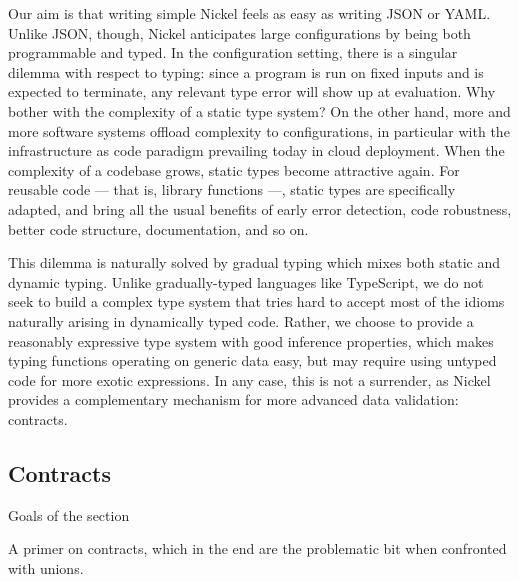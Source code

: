 \documentclass[sigplan,10pt,review,anonymous]{acmart}
\newcommand{\unsure}[2][1=]{}
\begin{document}
Our aim is that writing simple Nickel feels as easy as writing JSON or YAML.
Unlike JSON, though, Nickel anticipates large configurations by being both
programmable and typed. In the configuration setting, there is a singular
dilemma with respect to typing: since a program is run on fixed inputs and is
expected to terminate, any relevant type error will show up at evaluation.  Why
bother with the complexity of a static type system? On the other hand, more and
more software systems offload complexity to configurations, in particular with
the infrastructure as code paradigm prevailing today in cloud deployment. When
the complexity of a codebase grows, static types become attractive again.  For
reusable code — that is, library functions —, static types are specifically
adapted, and bring all the usual benefits of early error detection, code
robustness, better code structure, documentation, and so on.

This dilemma is naturally solved by gradual typing\cite{Siek06gradualtyping}
which mixes both static and dynamic typing. Unlike gradually-typed languages
like TypeScript\unsure{Todo: explain that typescript uses unions as
  static typing whereas we are speaking of dynamic contracts}, we do not seek to build a complex type system that tries hard
to accept most of the idioms naturally arising in dynamically typed code.
Rather, we choose to provide a reasonably expressive type system with good
inference properties, which makes typing functions operating on generic data easy,
but may require using untyped code for more exotic expressions.  In any case,
this is not a surrender, as Nickel provides a complementary mechanism for more
advanced data validation: contracts.

\subsection{Contracts}
{\color{red}Goals of the section

A primer on contracts, which in the end are the problematic bit when confronted
with unions.\vspace{0.5cm}}
\end{document}
